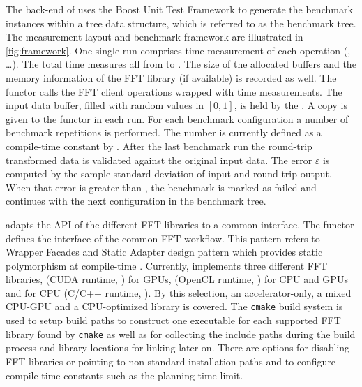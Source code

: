 The back-end of \gearshifft{} uses the Boost Unit Test Framework to generate the benchmark instances within a tree data structure, which is referred to as the benchmark tree.
The measurement layout and benchmark framework are illustrated in \cref{fig:framework}. One single run comprises time measurement of each operation (, \ldots). The total time measures all from  to . The size of the allocated buffers and the memory information of the FFT library (if available) is recorded as well. The functor  calls the FFT client operations wrapped with time measurements. The input data buffer, filled with random values in $[0,1]$, is held by the . A copy is given to the  functor in each run. For each benchmark configuration a number of benchmark repetitions is performed. The number is currently defined as a compile-time constant by . After the last benchmark run the round-trip transformed data is validated against the original input data. The error $\varepsilon$ is computed by the sample standard deviation of input and round-trip output. When that error is greater than , the benchmark is marked as failed and \gearshifft{} continues with the next configuration in the benchmark tree.


\gearshifft{} adapts the API of the different FFT libraries to a common interface. The  functor defines the interface of the common FFT workflow. This pattern refers to Wrapper Facades and Static Adapter design pattern which provides static polymorphism at compile-time \cite{bachmann}.
Currently, \gearshifft{} implements three different FFT libraries, \cufft{} (CUDA runtime, \cite{nvidia2010cufft}) for \nvidia{} GPUs, \clfft{} (OpenCL runtime, \cite{clfft}) for CPU and GPUs and \fftw{} for CPU (C/C++ runtime, \cite{FFTW05}). By this selection, an accelerator-only, a mixed CPU-GPU and a CPU-optimized library is covered.
%
The \texttt{cmake} build system is used to setup build paths to construct one executable for each supported FFT library found by \texttt{cmake} as well as for collecting the include paths during the build process and library locations for linking later on. There are options for disabling FFT libraries or pointing to non-standard installation paths and to configure compile-time constants such as the \fftw{} planning time limit. 

